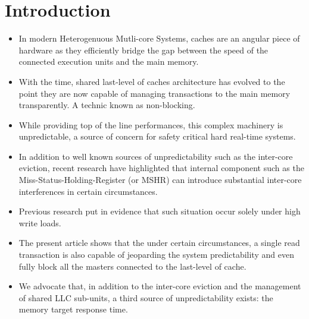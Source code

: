 \section{Introduction}
    \begin{itemize}
        \item In modern Heterogenuous Mutli-core Systems, caches are an angular piece of hardware as they efficiently bridge the gap between the speed of the connected execution units and the main memory.
        \item With the time, shared last-level of caches architecture has evolved to the point they are now capable of managing transactions to the main memory transparently. A technic known as non-blocking.
        \item While providing top of the line performances, this complex machinery is unpredictable, a source of concern for safety critical hard real-time systems.
        \item In addition to well known sources of unpredictability such as the inter-core eviction, recent research have highlighted that internal component such as the Miss-Status-Holding-Register (or MSHR) can introduce substantial inter-core interferences in certain circumstances.
        \item Previous research put in evidence that such situation occur solely under high write loads.
        \item The present article shows that the under certain circumstances, a single read transaction is also capable of jeoparding the system predictability and even fully block all the masters connected to the last-level of cache.
        \item We advocate that, in addition to the inter-core eviction and the management of shared LLC sub-units, a third source of unpredictability exists: the memory target response time.
    \end{itemize}
